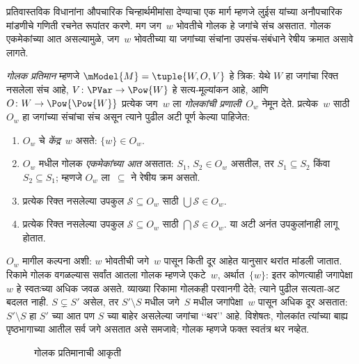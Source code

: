 \documentclass[../../../include/open-logic-section]{subfiles}
\begin{document}


प्रतिवास्तविक विधानांना औपचारिक
चिन्हार्थमीमांसा देण्याचा एक मार्ग
म्हणजे लुईस यांच्या अनौपचारिक
मांडणीचे गणिती रचनेत रूपांतर करणे.
मग जग~$w$ भोवतीचे गोलक
हे जगांचे संच असतात.
गोलक एकमेकांच्या आत
असल्यामुळे, जग~$w$ भोवतीच्या
या जगांच्या संचांना उपसंच-संबंधाने
रेषीय क्रमात असावे लागते.

\begin{defn}
  \emph{गोलक प्रतिमान} म्हणजे
  $\mModel{M} = \tuple{W, O, V}$
  हे त्रिक: येथे $W$ हा जगांचा
  रिक्त नसलेला संच आहे,
  $V\colon \PVar \to \Pow{W}$
  हे सत्य-मूल्यांकन आहे, आणि
  $O\colon W \to \Pow{\Pow{W}}$
  प्रत्येक जग~$w$ ला
  \emph{गोलकांची प्रणाली}~$O_w$
  नेमून देते. प्रत्येक~$w$ साठी
  $O_w$ हा जगांच्या संचांचा संच
  असून त्याने पुढील अटी पूर्ण
  केल्या पाहिजेत:
  \begin{enumerate}
  \item $O_w$ चे \emph{केंद्र}~$w$
    असते: $\{w\} \in O_w$.
  \item $O_w$ मधील गोलक
    \emph{एकमेकांच्या आत} असतात:
    $S_1$, $S_2 \in O_w$ असतील,
    तर $S_1 \subseteq S_2$ किंवा
    $S_2 \subseteq S_1$; म्हणजे
    $O_w$ ला~$\subseteq$ ने
    रेषीय क्रम असतो.
  \item प्रत्येक रिक्त नसलेल्या उपकुल $\mathcal S\subseteq O_w$
    साठी $\bigcup\mathcal S\in O_w$.
  \item प्रत्येक रिक्त नसलेल्या उपकुल $\mathcal S\subseteq O_w$
    साठी $\bigcap\mathcal S\in O_w$.
    या अटी अनंत उपकुलांनाही लागू होतात.
  \end{enumerate}
\end{defn}

$O_w$ मागील कल्पना अशी:
$w$ भोवतीची जगे~$w$ पासून
किती दूर आहेत यानुसार
थरांत मांडली जातात.
रिकामे गोलक वगळल्यास सर्वांत आतला गोलक म्हणजे
एकटे~$w$, अर्थात~$\{w\}$: इतर कोणत्याही जगापेक्षा
$w$ हे स्वतःच्या अधिक जवळ असते. व्याख्या रिकामा
गोलकही परवानगी देते; त्याने पुढील सत्यता-अट बदलत नाही.
$S \subsetneq S'$ असेल,
तर $S' \setminus S$
मधील जगे~$S$ मधील
जगांपेक्षा~$w$ पासून
अधिक दूर असतात:
$S'\setminus S$ हा $S'$ च्या आत पण $S$ च्या बाहेर
असलेल्या जगांचा ‘‘थर’’ आहे.
विशेषतः, गोलकांत
त्यांच्या बाह्य पृष्ठभागाच्या
आतील सर्व जगे असतात
असे समजावे; गोलक
म्हणजे फक्त स्वतंत्र
थर नव्हेत.

\begin{figure}
\begin{center}
\caption{गोलक प्रतिमानाची आकृती}
\end{center}
\end{figure}
\end{document}
